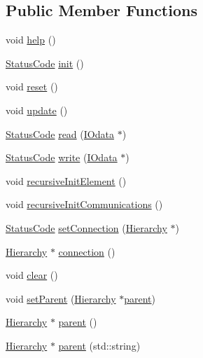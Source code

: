 \subsection*{Public Member Functions}
\begin{DoxyCompactItemize}
\item 
void \hyperlink{structInterfaceWrap_abcf87065a7b9099a7d05e7c0ddaf2487}{help} ()
\item 
\hyperlink{classStatusCode}{Status\+Code} \hyperlink{structInterfaceWrap_a2660ecdfbabd91d99d7b64c83e92f33c}{init} ()
\item 
void \hyperlink{structInterfaceWrap_a6c350b2f44c579187e6e4269cae29bae}{reset} ()
\item 
void \hyperlink{structInterfaceWrap_aee2f0407da52a1de8659b1d83af62238}{update} ()
\item 
\hyperlink{classStatusCode}{Status\+Code} \hyperlink{structInterfaceWrap_a4dd40213e6d37c73521450aa0c7a8f4d}{read} (\hyperlink{classIOdata}{I\+Odata} $\ast$)
\item 
\hyperlink{classStatusCode}{Status\+Code} \hyperlink{structInterfaceWrap_afbf6658c8be109e72f38d61438ec94d3}{write} (\hyperlink{classIOdata}{I\+Odata} $\ast$)
\item 
void \hyperlink{classElement_a3c0abcb36f8906688bb7e32608df7086}{recursive\+Init\+Element} ()
\item 
void \hyperlink{classElement_a82119ed37dff76508a2746a853ec35ba}{recursive\+Init\+Communications} ()
\item 
\hyperlink{classStatusCode}{Status\+Code} \hyperlink{classElement_ab476b4b1df5954141ceb14f072433b89}{set\+Connection} (\hyperlink{classHierarchy}{Hierarchy} $\ast$)
\item 
\hyperlink{classHierarchy}{Hierarchy} $\ast$ \hyperlink{classElement_af57444353c1ddf9fa0109801e97debf7}{connection} ()
\item 
void \hyperlink{classHierarchy_af4d43b0765b402670eed2d62c73405af}{clear} ()
\item 
void \hyperlink{classHierarchy_a585ad1aeec16077a0e532ab8b4fc557b}{set\+Parent} (\hyperlink{classHierarchy}{Hierarchy} $\ast$\hyperlink{classHierarchy_a1c7bec8257e717f9c1465e06ebf845fc}{parent})
\item 
\hyperlink{classHierarchy}{Hierarchy} $\ast$ \hyperlink{classHierarchy_a1c7bec8257e717f9c1465e06ebf845fc}{parent} ()
\item 
\hyperlink{classHierarchy}{Hierarchy} $\ast$ \hyperlink{classHierarchy_ad550588733bf75ac5c0fcfd7c8fd11a6}{parent} (std\+::string)
\item 

\end{DoxyCompactItemize}
